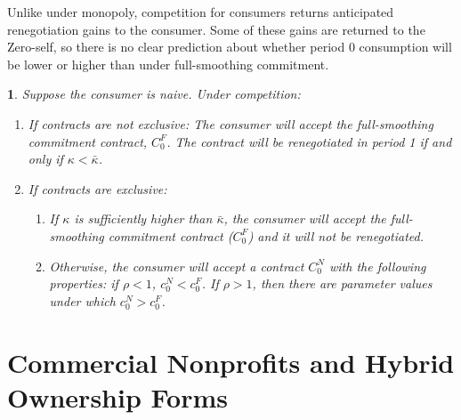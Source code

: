 \documentclass[11pt,english]{article}
\theoremstyle{plain}
\newtheorem{prop}{\protect\propositionname}
\theoremstyle{definition}
\providecommand{\propositionname}{Proposition}
\begin{document}
Unlike under monopoly, competition for consumers returns anticipated renegotiation
gains to the consumer. Some of these gains are returned to the Zero-self,
so there is no clear prediction about whether period 0 consumption
will be lower or higher than under full-smoothing commitment. 
\begin{prop}
Suppose the consumer is naive. Under competition:
\begin{enumerate} [label=\alph*)]
\item If contracts are not exclusive: The consumer will accept the full-smoothing
commitment contract, $C_{0}^{F}$. The contract will be renegotiated
in period 1 if and only if $\kappa<\bar{\kappa}$.

\item If contracts are exclusive: 

\begin{enumerate} [label=\roman*)]
\item If $\kappa$ is sufficiently higher than $\bar{\kappa}$, the
consumer will accept the full-smoothing commitment contract ($C_{0}^{F}$)
and it will not be renegotiated.

\item Otherwise, the consumer will accept a contract $C_{0}^{N}$ with
the following properties: if $\rho<1$, $c_{0}^{N}<c_{0}^{F}$. If
$\rho>1$, then there are parameter values under which $c_{0}^{N}>c_{0}^{F}$. \end{enumerate}
\end{enumerate}
\end{prop}


\section{Commercial Nonprofits and Hybrid Ownership Forms}

\label{nonprofits}
\end{document}
